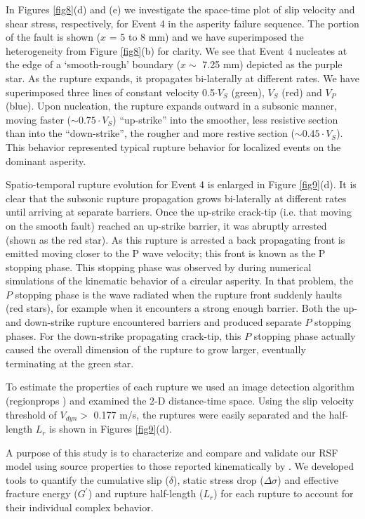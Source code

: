 \documentclass[preprint,1p, 10pt,authoryear]{elsarticle}
\begin{document}
In Figures \ref{fig8}(d) and (e) we investigate the space-time plot of slip velocity and shear stress, respectively, for Event 4 in the asperity failure sequence. The portion of the fault is shown ($x$ = 5 to 8 mm) and we have superimposed the heterogeneity from Figure \ref{fig8}(b) for clarity. We see that Event 4 nucleates at the edge of a `smooth-rough' boundary ($x \sim$ 7.25 mm) depicted as the purple star. As the rupture expands, it propagates bi-laterally at different rates. We have superimposed three lines of constant velocity 0.5$\cdot V_{S}$ (green), $V_{S}$ (red) and $V_{P}$ (blue).  Upon nucleation, the rupture expands outward in a subsonic manner, moving faster ($\sim 0.75 \cdot V_{S}$) ``up-strike'' into the smoother, less resistive section than into the ``down-strike'', the rougher and more restive section ($\sim 0.45\cdot V_{S}$). This behavior represented typical rupture behavior for localized events on the dominant asperity.

Spatio-temporal rupture evolution for Event 4 is enlarged in Figure \ref{fig9}(d).  It is clear that the subsonic rupture propagation grows bi-laterally at different rates until arriving at separate barriers. Once the up-strike crack-tip (i.e. that moving on the smooth fault) reached an up-strike barrier, it was abruptly arrested (shown as the red star).  As this rupture is arrested a back propagating front is emitted moving closer to the P wave velocity; this front is known as the P stopping phase. This stopping phase was observed by \citet{Madariaga1976} during numerical simulations of the kinematic behavior of a circular asperity.  In that problem, the $P$ stopping phase is the wave radiated when the rupture front suddenly haults (red stars), for example when it encounters a strong enough barrier.  Both the up- and down-strike rupture encountered barriers and produced separate $P$ stopping phases.  For the down-strike propagating crack-tip, this $P$ stopping phase actually caused the overall dimension of the rupture to grow larger, eventually terminating at the green star. 

To estimate the properties of each rupture we used an image detection algorithm (regionprops \citep{Gonzalez2009}) and examined the 2-D distance-time space. Using the slip velocity threshold of $V_{dyn}>$ 0.177 m/s, the ruptures were easily separated and the half-length $L_{r}$ is shown in Figures \ref{fig9}(d).

A purpose of this study is to characterize and compare and validate our RSF model using source properties to those reported kinematically by \citet{Selvadurai2019}. We developed tools to quantify the cumulative slip ($\delta$), static stress drop ($\Delta \sigma$) and effective fracture energy ($G^{'}$) and rupture half-length ($L_{r}$) for each rupture to account for their individual complex behavior.
\end{document}
